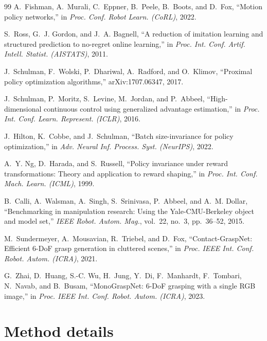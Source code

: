 \documentclass[conference]{IEEEtran}
\begin{document}
\begin{thebibliography}{99}
A.~Fishman, A.~Murali, C.~Eppner, B.~Peele, B.~Boots, and D.~Fox, ``Motion policy networks,'' in
\emph{Proc. Conf. Robot Learn. (CoRL)}, 2022.

S.~Ross, G.~J. Gordon, and J.~A. Bagnell, ``A reduction of imitation learning and structured prediction
to no-regret online learning,'' in \emph{Proc. Int. Conf. Artif. Intell. Statist. (AISTATS)}, 2011.

J.~Schulman, F.~Wolski, P.~Dhariwal, A.~Radford, and O.~Klimov, ``Proximal policy optimization
algorithms,'' arXiv:1707.06347, 2017.

J.~Schulman, P.~Moritz, S.~Levine, M.~Jordan, and P.~Abbeel, ``High-dimensional continuous control using
generalized advantage estimation,'' in \emph{Proc. Int. Conf. Learn. Represent. (ICLR)}, 2016.

J.~Hilton, K.~Cobbe, and J.~Schulman, ``Batch size-invariance for policy optimization,'' in \emph{Adv.
Neural Inf. Process. Syst. (NeurIPS)}, 2022.

A.~Y. Ng, D.~Harada, and S.~Russell, ``Policy invariance under reward transformations: Theory and
application to reward shaping,'' in \emph{Proc. Int. Conf. Mach. Learn. (ICML)}, 1999.

B.~Calli, A.~Walsman, A.~Singh, S.~Srinivasa, P.~Abbeel, and A.~M. Dollar, ``Benchmarking in
manipulation research: Using the Yale-CMU-Berkeley object and model set,'' \emph{IEEE Robot. Autom.
Mag.}, vol.~22, no.~3, pp.~36--52, 2015.

M.~Sundermeyer, A.~Mousavian, R.~Triebel, and D.~Fox, ``Contact-GraspNet: Efficient 6-DoF grasp
generation in cluttered scenes,'' in \emph{Proc. IEEE Int. Conf. Robot. Autom. (ICRA)}, 2021.

G.~Zhai, D.~Huang, S.-C. Wu, H.~Jung, Y.~Di, F.~Manhardt, F.~Tombari, N.~Navab, and B.~Busam,
``MonoGraspNet: 6-DoF grasping with a single RGB image,'' in \emph{Proc. IEEE Int. Conf. Robot. Autom.
(ICRA)}, 2023.

\end{thebibliography}

\appendices
\raggedbottom
\section{Method details}
\label{app:methods}
\end{document}
